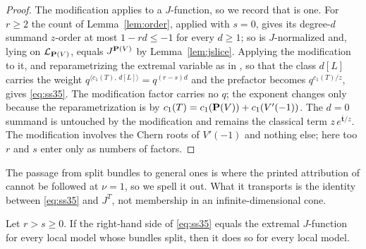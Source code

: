 \begin{proof}
  The modification applies to a \(J\)-function, so we record that
  \cite[(34)]{SS} is one.  For \(r\ge2\) the count of Lemma~\ref{lem:order},
  applied with \(s=0\), gives its degree-\(d\) summand \(z\)-order at most
  \(1-rd\le-1\) for every \(d\ge1\); so \cite[(34)]{SS} is \(J\)-normalized
  and, lying on \(\mathcal L_{\mathbf P(V)}\), equals \(J^{\mathbf P(V)}\) by
  Lemma~\ref{lem:jslice}.  Applying the modification to it, and reparametrizing
  the extremal variable as in \cite[(33)]{SS}, so that the class \(d[L]\)
  carries the weight
  \(q^{\langle c_{1}(T),\,d[L]\rangle}=q^{(r-s)d}\) and the prefactor becomes
  \(q^{c_{1}(T)/z}\), gives \eqref{eq:ss35}.  The modification factor carries
  no \(q\); the exponent changes only because the reparametrization is by
  \(c_{1}(T)=c_{1}(\mathbf P(V))+c_{1}(V'(-1))\).  The \(d=0\) summand is untouched
  by the modification and
  remains the classical term \(z\,e^{\bar{\mathbf t}/z}\).  The modification
  involves the Chern roots of \(V'(-1)\) and nothing else; here too \(r\) and
  \(s\) enter only as numbers of factors.
\end{proof}

The passage from split bundles to general ones is where the printed
attribution of \cite[Remark~4.5(3)]{SS} cannot be followed at \(\nu=1\), so
we spell it out.  What it transports is the identity between
\eqref{eq:ss35} and \(J^{T}\), not membership in an infinite-dimensional
cone.

\begin{lemma}
  \label{lem:split-reduction}
  Let \(r>s\ge0\).  If the right-hand side of \eqref{eq:ss35} equals the
  extremal \(J\)-function for every local model whose bundles split, then it
  does so for every local model.
\end{lemma}

